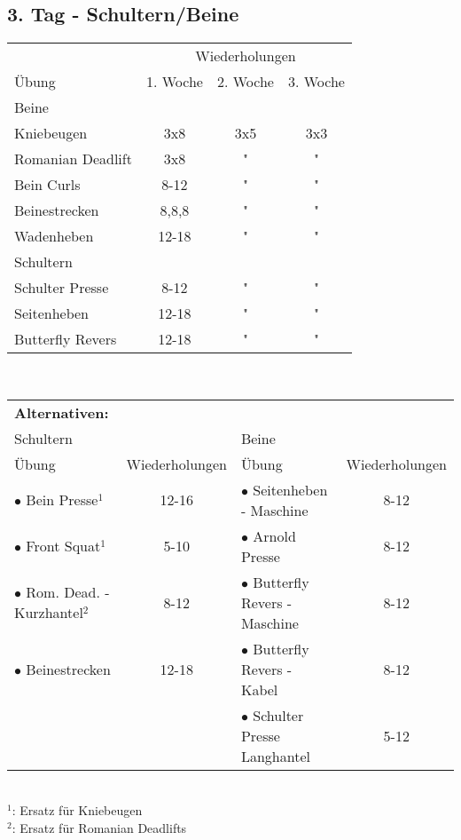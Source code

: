 \documentclass[10pt,a4paper]{article}
\begin{document}
	\subsection{3. Tag - Schultern/Beine}
		\begin{tabular}{l||c|c|c}
			& \multicolumn{3}{c}{Wiederholungen} \\ 
			Übung & 1. Woche & 2. Woche & 3. Woche \\ 
			\hline
			\hline 
			\multicolumn{4}{l}{Beine}	\\
			\hline
			\hline
			Kniebeugen & 3x8 & 3x5 & 3x3 \\ 
			\hline 
			Romanian Deadlift & 3x8 & " & " \\
			\hline 
			Bein Curls & 8-12 & " & " \\ 
			\hline 
			Beinestrecken & 8,8,8 & " & " \\ 
			\hline
			Wadenheben & 12-18	& "	& "	\\
			\hline 
			\hline
			\multicolumn{4}{l}{Schultern}	\\
			\hline
			\hline			
			Schulter Presse & 8-12 & " & " \\ 
			\hline 
			Seitenheben & 12-18 & " & " \\ 
			\hline 
			Butterfly Revers & 12-18 & " & " \\
		\end{tabular} 
		\vspace{1cm}\\
		\begin{tabular}{lc|lc}
			\multicolumn{4}{l}{\textbf{Alternativen:}}	\\
			\multicolumn{2}{l}{Schultern} & \multicolumn{2}{l}{Beine} \\ 
			\hline
			\midrule
			Übung	& Wiederholungen	& Übung	& Wiederholungen	\\
			$\bullet$ Bein Presse$^{1}$	& 12-16	& $\bullet$ Seitenheben - Maschine	& 8-12	\\
			$\bullet$ Front Squat$^{1}$	& 5-10	& $\bullet$ Arnold Presse	& 8-12	\\
			$\bullet$ Rom. Dead. - Kurzhantel$^{2}$	& 8-12	& $\bullet$ Butterfly Revers - Maschine	& 8-12	\\
			$\bullet$ Beinestrecken	& 12-18	& $\bullet$ Butterfly Revers - Kabel	& 8-12	\\
			&& $\bullet$ Schulter Presse Langhantel	& 5-12	\\
		\end{tabular}	\\
	$^{1}$: Ersatz für Kniebeugen	\\
	$^{2}$: Ersatz für Romanian Deadlifts
\end{document}
